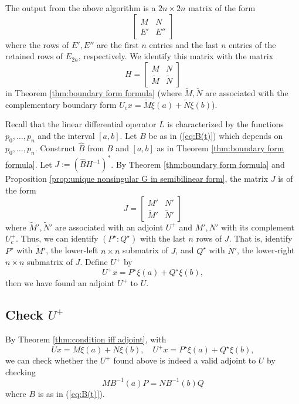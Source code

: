 \documentclass[11pt, oneside, a4paper]{article}
\begin{document}
The output from the above algorithm is a $2n\times 2n$ matrix of the form
\[\begin{bmatrix}M & N\\ E' & E''\end{bmatrix}\]
where the rows of $E', E''$ are the first $n$ entries and the last $n$ entries of the retained rows of $E_{2n}$, respectively. We identify this matrix with the matrix
\[H = \begin{bmatrix}M&N\\ \tilde{M} & \tilde{N}\end{bmatrix}\]
in Theorem \ref{thm:boundary form formula} (where $\tilde{M}, \tilde{N}$ are associated with the complementary boundary form $U_c x = \tilde{M}\xi(a) + \tilde{N}\xi(b)$).

Recall that the linear differential operator $L$ is characterized by the functions $p_0,\ldots,p_n$ and the interval $[a,b]$. Let $B$ be as in (\ref{eq:B(t)}) which depends on $p_0,\ldots,p_n$. Construct $\hat{B}$ from $B$ and $[a,b]$ as in Theorem \ref{thm:boundary form formula}. Let $J:=(\hat{B}H^{-1})^*$. By Theorem \ref{thm:boundary form formula} and Proposition \ref{prop:unique nonsingular G in semibilinear form}, the matrix $J$ is of the form
\[J=\begin{bmatrix}M' & N'\\ \tilde{M}' & \tilde{N}'\end{bmatrix}\]
where $\tilde{M}', \tilde{N}'$ are associated with an adjoint $U^+$ and $M', N'$ with its complement $U_c^+$.
Thus, we can identify $(P^\star:Q^\star)$ with the last $n$ rows of $J$. That is, identify $P^\star$ with $\tilde{M}'$, the lower-left $n\times n$ submatrix of $J$, and $Q^\star$ with $\tilde{N}'$, the lower-right $n\times n$ submatrix of $J$. Define $U^+$ by
\[U^+x = P^\star \xi(a) + Q^\star \xi(b),\]
then we have found an adjoint $U^+$ to $U$.

\subsection{Check $U^+$}
By Theorem \ref{thm:condition iff adjoint}, with
\[Ux = M\xi(a) + N\xi(b),\quad U^+x = P^\star \xi(a) + Q^\star \xi(b),\]
we can check whether the $U^+$ found above is indeed a valid adjoint to $U$ by checking 
\[MB^{-1}(a)P = NB^{-1}(b)Q\]
where $B$ is as in (\ref{eq:B(t)}).
\end{document}
